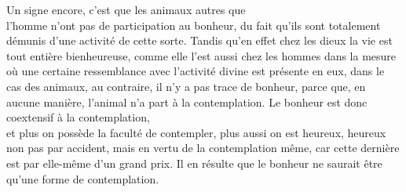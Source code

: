 \documentclass[french,twoside]{book} %
\begin{document}
Un signe encore, c’est que les animaux autres que \\
l’homme n’ont pas de participation au bonheur, du fait qu’ils sont totalement démunis d’une activité de cette sorte. Tandis qu’en effet chez les dieux la vie est tout entière bienheureuse, comme elle l’est aussi chez les hommes dans la mesure où une certaine ressemblance avec l’activité divine est présente en eux, dans le cas des animaux, au contraire, il n’y a pas trace de bonheur, parce que, en aucune manière, l’animal n’a part à la contemplation. Le bonheur est donc coextensif à la contemplation, \\
et plus on possède la faculté de contempler, plus aussi on est heureux, heureux non pas par accident, mais en vertu de la contemplation même, car cette dernière est par elle-même d’un grand prix. Il en résulte que le bonheur ne saurait être qu’une forme de contemplation.
\end{document}
